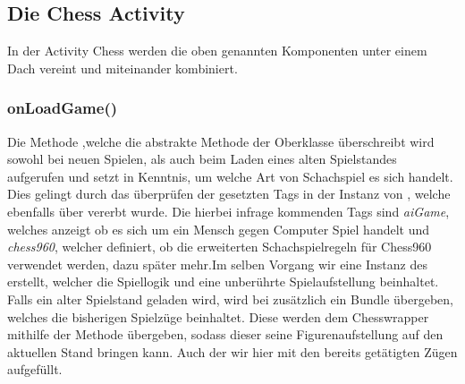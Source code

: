 \subsection{Die Chess Activity}

In der Activity Chess werden die oben genannten Komponenten unter einem Dach 
vereint und miteinander kombiniert.

\subsubsection{onLoadGame()}

Die Methode ,welche die abstrakte Methode der Oberklasse
 überschreibt wird sowohl bei neuen Spielen, als auch beim
Laden eines alten Spielstandes aufgerufen und setzt in Kenntnis, um welche Art
von Schachspiel es sich handelt. Dies gelingt durch das überprüfen der gesetzten
Tags in der Instanz von , welche ebenfalls über 
vererbt wurde. Die hierbei infrage kommenden Tags sind \emph{aiGame}, welches
anzeigt ob es sich um ein Mensch gegen Computer Spiel handelt und
\emph{chess960}, welcher definiert, ob die erweiterten Schachspielregeln für
Chess960 verwendet werden, dazu später mehr.\newline Im selben Vorgang wir eine
Instanz des  erstellt, welcher die Spiellogik und eine
unberührte Spielaufstellung beinhaltet. Falls ein alter Spielstand geladen wird,
wird bei  zusätzlich ein Bundle übergeben, welches die
bisherigen Spielzüge beinhaltet. Diese werden dem Chesswrapper mithilfe der
Methode  übergeben, sodass dieser seine Figurenaufstellung auf
den aktuellen Stand bringen kann. Auch der  wir hier
mit den bereits getätigten Zügen aufgefüllt.

